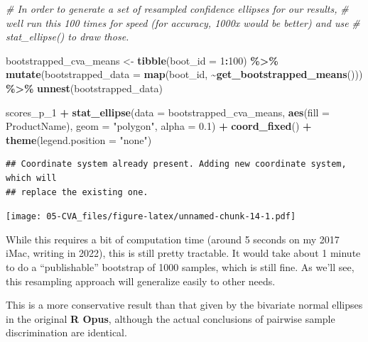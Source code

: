 \documentclass[
]{book}
\newenvironment{Shaded}{\begin{snugshade}}{\end{snugshade}}
\newcommand{\AttributeTok}[1]{\textcolor[rgb]{0.13,0.29,0.53}{#1}}
\newcommand{\CommentTok}[1]{\textcolor[rgb]{0.56,0.35,0.01}{\textit{#1}}}
\newcommand{\DecValTok}[1]{\textcolor[rgb]{0.00,0.00,0.81}{#1}}
\newcommand{\FloatTok}[1]{\textcolor[rgb]{0.00,0.00,0.81}{#1}}
\newcommand{\FunctionTok}[1]{\textcolor[rgb]{0.13,0.29,0.53}{\textbf{#1}}}
\newcommand{\NormalTok}[1]{#1}
\newcommand{\OtherTok}[1]{\textcolor[rgb]{0.56,0.35,0.01}{#1}}
\newcommand{\SpecialCharTok}[1]{\textcolor[rgb]{0.81,0.36,0.00}{\textbf{#1}}}
\newcommand{\StringTok}[1]{\textcolor[rgb]{0.31,0.60,0.02}{#1}}
\begin{document}
\begin{Shaded}
\begin{Highlighting}[]
\CommentTok{\# In order to generate a set of resampled confidence ellipses for our results,}
\CommentTok{\# we\textquotesingle{}ll run this 100 times for speed (for accuracy, 1000x would be better) and use}
\CommentTok{\# stat\_ellipse() to draw those.}

\NormalTok{bootstrapped\_cva\_means }\OtherTok{\textless{}{-}} 
  \FunctionTok{tibble}\NormalTok{(}\AttributeTok{boot\_id =} \DecValTok{1}\SpecialCharTok{:}\DecValTok{100}\NormalTok{) }\SpecialCharTok{\%\textgreater{}\%}
  \FunctionTok{mutate}\NormalTok{(}\AttributeTok{bootstrapped\_data =} \FunctionTok{map}\NormalTok{(boot\_id, }\SpecialCharTok{\textasciitilde{}}\FunctionTok{get\_bootstrapped\_means}\NormalTok{())) }\SpecialCharTok{\%\textgreater{}\%}
  \FunctionTok{unnest}\NormalTok{(bootstrapped\_data)}

\NormalTok{scores\_p\_1 }\SpecialCharTok{+} 
  \FunctionTok{stat\_ellipse}\NormalTok{(}\AttributeTok{data =}\NormalTok{ bootstrapped\_cva\_means,}
               \FunctionTok{aes}\NormalTok{(}\AttributeTok{fill =}\NormalTok{ ProductName),}
               \AttributeTok{geom =} \StringTok{"polygon"}\NormalTok{,}
               \AttributeTok{alpha =} \FloatTok{0.1}\NormalTok{) }\SpecialCharTok{+}
  \FunctionTok{coord\_fixed}\NormalTok{() }\SpecialCharTok{+} 
  \FunctionTok{theme}\NormalTok{(}\AttributeTok{legend.position =} \StringTok{"none"}\NormalTok{)}
\end{Highlighting}
\end{Shaded}

\begin{verbatim}
## Coordinate system already present. Adding new coordinate system, which will
## replace the existing one.
\end{verbatim}

\texttt{[image: 05-CVA\_files/figure-latex/unnamed-chunk-14-1.pdf]}

While this requires a bit of computation time (around 5 seconds on my 2017 iMac, writing in 2022), this is still pretty tractable. It would take about 1 minute to do a ``publishable'' bootstrap of 1000 samples, which is still fine. As we'll see, this resampling approach will generalize easily to other needs.

This is a more conservative result than that given by the bivariate normal ellipses in the original \textbf{R Opus}, although the actual conclusions of pairwise sample discrimination are identical.
\end{document}
